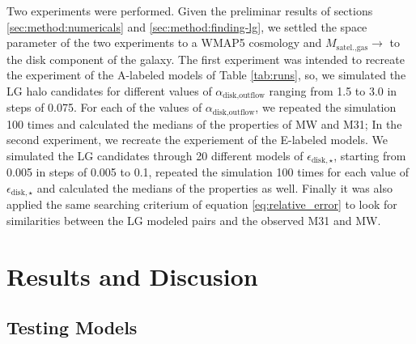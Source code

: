 \documentclass[usenatbib]{mn2e}
\begin{document}
Two experiments were performed. Given the preliminar results of sections \ref{sec:method:numericals} and \ref{sec:method:finding-lg}, 
we settled the space parameter of the two experiments to a WMAP5 cosmology and $M_{\text{satel.,gas}}\to$ to the disk component of the galaxy.
The first experiment was intended to recreate the experiment of the A-labeled models of Table \ref{tab:runs}, so, we simulated the LG halo candidates for different
values of $\alpha_{\text{disk,outflow}}$ ranging from 1.5  to 3.0 in steps of 0.075. For each of the values of $\alpha_{\text{disk,outflow}}$, we repeated
the simulation 100 times and calculated the medians of the properties of MW and M31; 
In the second experiment, we recreate the experiement of the E-labeled models.  We simulated the LG candidates through 20 different models of 
$\epsilon_{\text{disk},\star}$, starting from 0.005 in steps of 0.005 to 0.1, repeated the simulation 100 times for each value of 
$\epsilon_{\text{disk},\star}$ and calculated the medians of the properties as well. Finally  it was also applied the same searching criterium of equation
\ref{eq:relative_error} to look for similarities between the LG modeled pairs and the observed M31 and MW.

\section{Results and Discusion}
\label{sec:results}


\subsection{Testing Models}
\label{sec:calibration}
\end{document}

